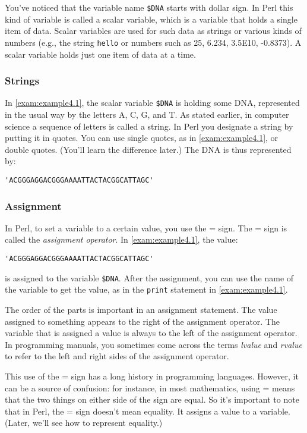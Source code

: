 You've noticed that the variable name \verb|$DNA| starts with dollar sign. In Perl this kind of variable is called a scalar variable, which is a variable that holds a single item of data. Scalar variables are used for such data as strings or various kinds of numbers (e.g., the string \verb|hello| or numbers such as 25, 6.234, 3.5E10, -0.8373). A scalar variable holds just one item of data at a time. 

\subsubsection{Strings}
In \autoref{exam:example4.1}, the scalar variable \verb|$DNA| is holding some DNA, represented in the usual way by the letters A, C, G, and T. As stated earlier, in computer science a sequence of letters is called a string.  In Perl you designate a string by putting it in quotes. You can use single quotes, as in \autoref{exam:example4.1}, or double quotes. (You'll learn the difference later.) The DNA is thus represented by:

\begin{lstlisting}
'ACGGGAGGACGGGAAAATTACTACGGCATTAGC'
\end{lstlisting}

\subsubsection{Assignment}
In Perl, to set a variable to a certain value, you use the = sign. The = sign is called the \textit{assignment operator}. In \autoref{exam:example4.1}, the value: 

\begin{lstlisting}
'ACGGGAGGACGGGAAAATTACTACGGCATTAGC' 
\end{lstlisting}

is assigned to the variable \verb|$DNA|. After the assignment, you can use the name of the variable to get the value, as in the \verb|print| statement in \autoref{exam:example4.1}.  

The order of the parts is important in an assignment statement. The value assigned to something appears to the right of the assignment operator. The variable that is assigned a value is always to the left of the assignment operator. In programming manuals, you sometimes come across the terms \textit{lvalue} and \textit{rvalue} to refer to the left and right sides of the assignment operator.

This use of the = sign has a long history in programming languages.  However, it can be a source of confusion: for instance, in most mathematics, using = means that the two things on either side of the sign are equal. So it's important to note that in Perl, the = sign doesn't mean equality. It assigns a value to a variable. (Later, we'll see how to represent equality.)

